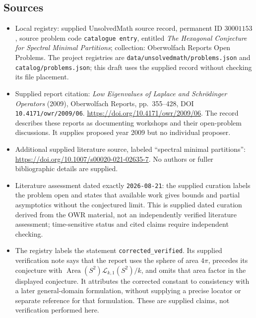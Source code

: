 \documentclass[11pt]{article}
\begin{document}
\subsection{Sources}
\begin{itemize}
\item Local registry: supplied UnsolvedMath source record, permanent ID \(30001153\), source problem code \texttt{catalogue entry}, entitled \emph{The Hexagonal Conjecture for Spectral Minimal Partitions}; collection: Oberwolfach Reports Open Problems. The project registries are \texttt{data/unsolvedmath/problems.json} and \texttt{catalog/problems.json}; this draft uses the supplied record without checking its file placement.
\item Supplied report citation: \emph{Low Eigenvalues of Laplace and Schrödinger Operators} (2009), Oberwolfach Reports, pp.\ 355--428, DOI \texttt{10.4171/owr/2009/06}. \url{https://doi.org/10.4171/owr/2009/06}. The record describes these reports as documenting workshops and their open-problem discussions. It supplies proposed year 2009 but no individual proposer.
\item Additional supplied literature source, labeled ``spectral minimal partitions'': \url{https://doi.org/10.1007/s00020-021-02635-7}. No authors or fuller bibliographic details are supplied.
\item Literature assessment dated exactly \texttt{2026-08-21}: the supplied curation labels the problem open and states that available work gives bounds and partial asymptotics without the conjectured limit. This is supplied dated curation derived from the OWR material, not an independently verified literature assessment; time-sensitive status and cited claims require independent checking.
\item The registry labels the statement \texttt{corrected\_verified}. Its supplied verification note says that the report uses the sphere of area \(4\pi\), precedes its conjecture with \(\operatorname{Area}(S^2)\mathcal L_{k,1}(S^2)/k\), and omits that area factor in the displayed conjecture. It attributes the corrected constant to consistency with a later general-domain formulation, without supplying a precise locator or separate reference for that formulation. These are supplied claims, not verification performed here.
\end{itemize}
\end{document}
